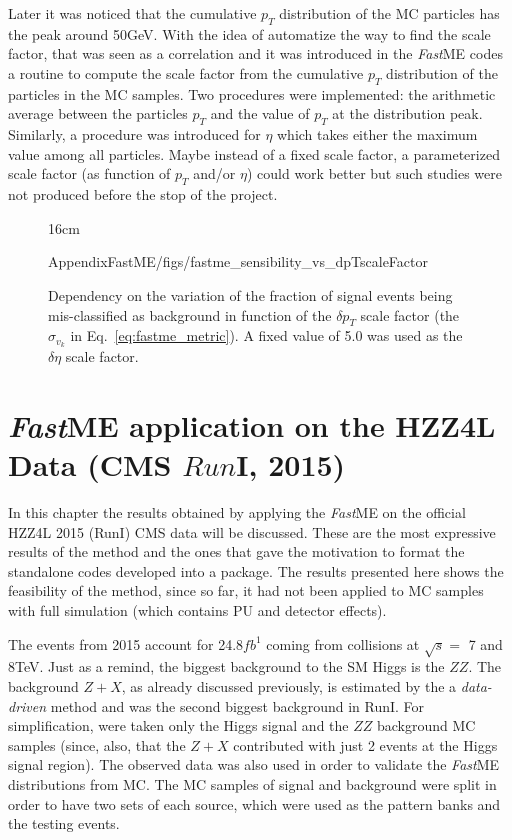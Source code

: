 Later it was noticed that the cumulative $p_{T}$ distribution of the MC particles has the peak around 50GeV. With the idea of automatize the way to find the scale factor, that was seen as a correlation and it was introduced in the \textit{Fast}ME codes a routine to compute the scale factor from the cumulative $p_{T}$ distribution of the particles in the MC samples. Two procedures were implemented: the arithmetic average between the particles $p_{T}$ and the value of $p_{T}$ at the distribution peak. Similarly, a procedure was introduced for $\eta$ which takes either the maximum value among all particles. Maybe instead of a fixed scale factor, a parameterized scale factor (as function of $p_{T}$ and/or $\eta$) could work better but such studies were not produced before the stop of the project.

\begin{figure}[htbp]{16cm}
	\caption{Dependency on the variation of the fraction of signal events being mis-classified as background in function of the $\delta p_{T}$ scale factor (the $\sigma_{v_{k}}$ in Eq.~\ref{eq:fastme_metric}). A fixed value of 5.0 was used as the $\delta \eta$ scale factor.}
	\begin{overpic}
		[scale=0.3,trim={0cm 0cm 0cm 0cm},clip]{AppendixFastME/figs/fastme_sensibility_vs_dpTscaleFactor}
	\end{overpic}
	\label{fig:dpt_scale}
\end{figure}

\section{\textit{Fast}ME application on the HZZ4L Data (CMS $Run$I, 2015)}
In this chapter the results obtained by applying the \textit{Fast}ME on the official HZZ4L 2015 (RunI) CMS data will be discussed. These are the most expressive results of the method and the ones that gave the motivation to format the standalone codes developed into a package. The results presented here shows the feasibility of the method, since so far, it had not been applied to MC samples with full simulation (which contains PU and detector effects).

The events from 2015 account for 24.8$fb^{1}$ coming from collisions at $\sqrt{s}=$ 7 and 8TeV. Just as a remind, the biggest background to the SM Higgs is the $ZZ$. The background $Z+X$, as already discussed previously, is estimated by the a \textit{data-driven} method and was the second biggest background in RunI. For simplification, were taken only the Higgs signal and the $ZZ$ background MC samples (since, also, that the $Z+X$ contributed with just 2 events at the Higgs signal region). The observed data was also used in order to validate the \textit{Fast}ME distributions from MC. The MC samples of signal and background were split in order to have two sets of each source, which were used as the pattern banks and the testing events.

